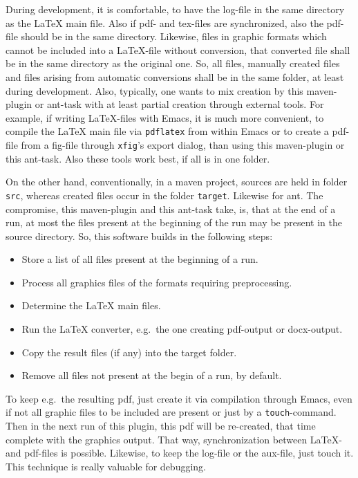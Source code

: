 \documentclass[12pt]{book}
\newcommand{\gls}[1]{#1}
\begin{document}
During development, it is comfortable, 
to have the log-file in the same directory as the \LaTeX{} main file. 
Also if pdf- and tex-files are synchronized, 
also the pdf-file should be in the same directory. 
Likewise, files in graphic formats 
which cannot be included into a \LaTeX-file without conversion, 
that converted file shall be in the same directory as the original one. 
So, all files, manually created files 
and files arising from automatic conversions 
shall be in the same folder, at least during development. 
Also, typically, one wants to mix creation by this maven-plugin or ant-task 
with at least partial creation through external tools. 
For example, if writing \LaTeX-files with Emacs, 
it is much more convenient, to compile the \LaTeX{} main file 
via \texttt{pdflatex} from within Emacs 
or to create a pdf-file from a \gls{fig}-file 
through \texttt{xfig}'s export dialog, 
than using this maven-plugin or this ant-task. 
Also these tools work best, if all is in one folder. 

On the other hand, 
conventionally, in a maven project, 
sources are held in folder \texttt{src}, 
whereas created files occur in the folder \texttt{target}. 
Likewise for ant. 
The compromise, this maven-plugin and this ant-task take, 
is, that at the end of a run, 
at most the files present at the beginning of the run 
may be present in the source directory. 
So, this software builds in the following steps: 
%
\begin{itemize}
\item
Store a list of all files present at the beginning of a run.
\item
Process all graphics files of the formats requiring preprocessing.
\item
Determine the \LaTeX{} main files.
\item
Run the \LaTeX{} converter, e.g.~the one creating pdf-output or docx-output.
\item
Copy the result files (if any) into the target folder.
\item
Remove all files not present at the begin of a run, by default. 
\end{itemize}

To keep e.g.~the resulting pdf, 
just create it via compilation through Emacs, 
even if not all graphic files to be included are present 
or just by a \texttt{touch}-command. 
Then in the next run of this plugin, 
this pdf will be re-created, 
that time complete with the graphics output. 
That way, synchronization between \LaTeX- and pdf-files is possible. 
Likewise, to keep the log-file or the aux-file, just touch it. 
This technique is really valuable for debugging. 
\end{document}
